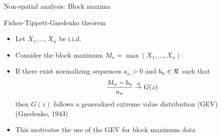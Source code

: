 \documentclass{beamer}
\begin{document}

%		

\begin{frame}{Non-spatial analysis: Block maxima}
	\begin{adjustwidth}{1em}{0em}
		Fisher-Tippett-Gnedenko theorem \vspace{1em}
		\begin{itemize} \setlength{\itemsep}{1em}
			\item Let $X_1, \ldots, X_n$ be i.i.d.
			\item Consider the block maximum $M_n = \max(X_1, \ldots, X_n)$
			\item If there exist normalizing sequences $a_n > 0$ and $b_n \in {\cal R}$ such that $$\frac{ M_n - b_n }{ a_n } \stackrel{\mathrm{d}}{\rightarrow} G(z)$$ then $G(z)$ follows a generalized extreme value distribution (GEV) (Gnedenko, 1943)
			\item This motivates the use of the GEV for block maximum data
		\end{itemize}
	\end{adjustwidth}
\end{frame}
\end{document}
